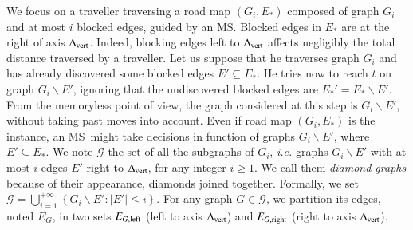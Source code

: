 \documentclass[preprint]{elsarticle}
\newcommand{\set}[1]{\left\{ #1 \right\}}
\newcommand{\card}[1]{\left| #1 \right|}
\newcommand{\mcalg}{\mathcal{G}}
\newcommand{\mcalr}{\mathcal{R}}
\newcommand{\mts}{MS}
\newcommand{\deltavert}{\Delta_{\mbox{\scriptsize{vert}}}}
\newcommand{\eleft}[1]{E_{#1, \mbox{\scriptsize{left}}}}
\newcommand{\eright}[1]{E_{#1, \mbox{\scriptsize{right}}}}
\begin{document}

We focus on a traveller traversing a road map $\left(G_i,E_*\right)$ composed of graph $G_i$ and at most $i$ blocked edges, guided by an \mts . Blocked edges in $E_*$ are at the right of axis $\deltavert$. Indeed, blocking edges left to $\deltavert$ affects negligibly the total distance traversed by a traveller. Let us suppose that he traverses graph $G_i$ and has already discovered some blocked edges $E' \subseteq E_*$. He tries now to reach $t$ on graph $G_i\backslash E'$, ignoring that the undiscovered blocked edges are $E_*' = E_* \backslash E'$. From the memoryless point of view, the graph considered at this step is $G_i\backslash E'$, without taking past moves into account. Even if road map $\left(G_i,E_*\right)$ is the instance, an \mts ~might take decisions in function of graphs $G_i\backslash E'$, where $E' \subseteq E_*$.
We note $\mcalg$ the set of all the subgraphs of $G_i$, {\em i.e.} graphs $G_i\backslash E'$ with at most $i$ edges $E'$ right to $\deltavert$, for any integer $i \geq 1$. We call them \textit{diamond graphs} because of their appearance, diamonds joined together. Formally, we set $\mcalg = \bigcup_{i=1}^{+\infty} \set{G_i\backslash E' : \card{E'} \leq i}$. For any graph $G \in \mcalg$, we partition its edges, noted $E_G$, in two sets $\eleft{G}$ (left to axis $\deltavert$) and $\eright{G}$ (right to axis $\deltavert$). 
\end{document}
